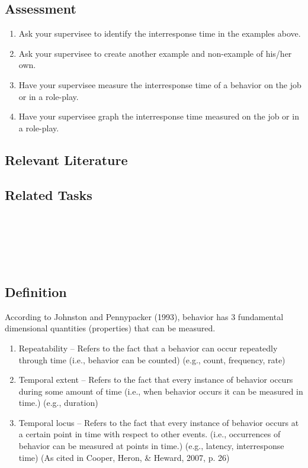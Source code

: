 \subsection{Assessment}
\begin{enumerate}
\item Ask your supervisee to identify the interresponse time in the examples above. 
\item Ask your supervisee to create another example and non-example of his/her own. 
\item Have your supervisee measure the interresponse time of a behavior on the job or in a role-play. 
\item Have your supervisee graph the interresponse time measured on the job or in a role-play.
\end{enumerate}
%
\subsection{Relevant Literature}
\begin{refsection}
\nocite{blough1963interresponse,cooper2007applied,favell1980rapid}
\printbibliography[heading=none]
\end{refsection}
%
\subsection{Related Tasks}
\fouraFive{}\\
\fouriOne{}\\
\fourhOne{}\\
\fourFKFourtySeven{}\\
%
\clearpage \section[\fourFKFourtySeven{}]{\fourFKFourtySeven{}%
              }
\subsection{Definition}
According to Johnston and Pennypacker (1993), behavior has 3 fundamental dimensional quantities (properties) that can be measured.
\begin{enumerate}
\item Repeatability – Refers to the fact that a behavior can occur repeatedly through time (i.e., behavior can be counted) (e.g., count, frequency, rate)
\item Temporal extent – Refers to the fact that every instance of behavior occurs during some amount of time (i.e., when behavior occurs it can be measured in time.) (e.g., duration)
\item Temporal locus – Refers to the fact that every instance of behavior occurs at a certain point in time with respect to other events. (i.e., occurrences of behavior can be measured at points in time.) (e.g., latency, interresponse time) (As cited in Cooper, Heron, \& Heward, 2007, p. 26)
\end{enumerate}
%
